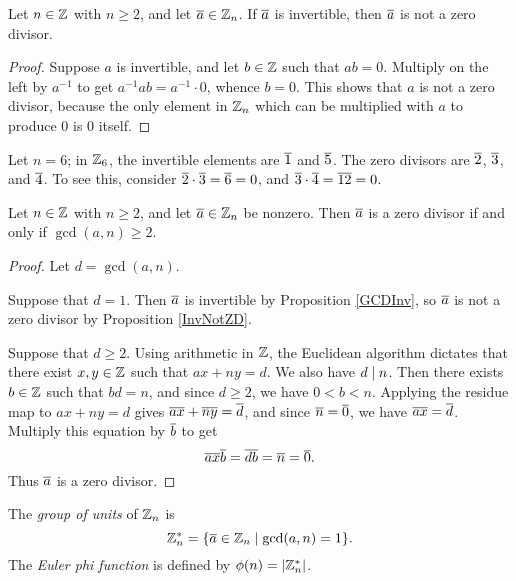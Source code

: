 \documentclass{amsart}
\begin{document}
\begin{Prop} \label{InvNotZD}
Let $n \in \mathbb{Z}$ with $n \ge 2$, and let $\overline{a} \in \mathbb{Z}_n$.
If $\overline{a}$ is invertible, then $\overline{a}$ is not a zero divisor.
\end{Prop}

\begin{proof}
Suppose $a$ is invertible, and let $b \in \mathbb{Z}$
such that $a b = 0$.
Multiply on the left by $a^{-1}$ to get
$a^{-1} a b = a^{-1} \cdot 0$,
whence $b = 0$.  This shows that $a$ is not a zero divisor,
because the only element in $\mathbb{Z}_n$ which can be multiplied with $a$
to produce $0$ is $0$ itself.
\end{proof}

\begin{Exm}
Let $n = 6$; in $\mathbb{Z}_{6}$, the invertible elements are $\overline{1}$ and $\overline{5}$.
The zero divisors are $\overline{2}$, $\overline{3}$, and $\overline{4}$.
To see this, consider $\overline{2} \cdot \overline{3} = \overline{6} = 0$,
and $\overline{3} \cdot \overline{4} = \overline{12} = 0$.
\end{Exm}

\newpage

\begin{Prop}
Let $n \in \mathbb{Z}$ with $n \ge 2$, and let $\overline{a} \in \mathbb{Z}_n$ be nonzero.
Then $\overline{a}$ is a zero divisor if and only if $\gcd(a,n) \ge 2$.
\end{Prop}

\begin{proof}
Let $d = \gcd(a,n)$.

Suppose that $d = 1$.  Then $\overline{a}$ is invertible by Proposition \ref{GCDInv}, so $\overline{a}$ is not
a zero divisor by Proposition \ref{InvNotZD}.

Suppose that $d \ge 2$.  Using arithmetic in $\mathbb{Z}$, the Euclidean algorithm
dictates that there exist $x,y \in \mathbb{Z}$ such that $ax + ny = d$.
We also have $d \mid n$.
Then there exists $b \in \mathbb{Z}$ such that $bd = n$, and since $d \ge 2$, we have $0 < b < n$.
Applying the residue map to $ax + ny = d$ gives $\overline{a} \overline{x} + \overline{n} \overline{y} = \overline{d}$,
and since $\overline{n} = \overline{0}$, we have $\overline{a} \overline{x} = \overline{d}$.
Multiply this equation by $\overline{b}$ to get
\[ \overline{a} \overline{x} \overline{b} = \overline{db} = \overline{n} = \overline{0} . \]
Thus $\overline{a}$ is a zero divisor.
\end{proof}

\begin{Def}
The {\em group of units} of $\mathbb{Z}_n$ is
\[ \mathbb{Z}_n^* = \{ \overline{a} \in \mathbb{Z}_n \mid \gcd(a,n) = 1 \} . \]
The {\em Euler phi function} is defined by $\phi(n) = |\mathbb{Z}_n^*|$.
\end{Def}
\end{document}
